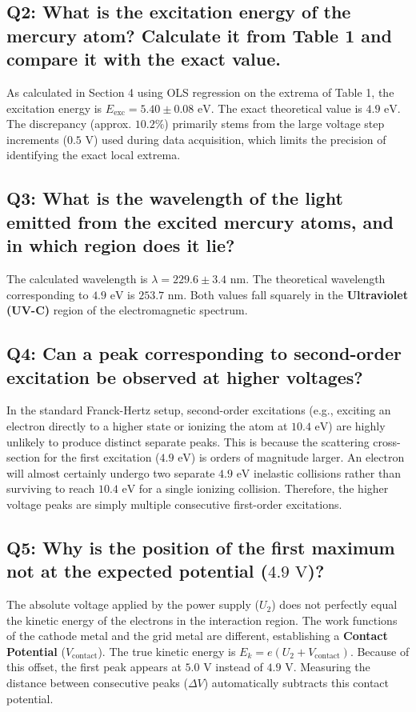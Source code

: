 \documentclass[a4paper,11pt]{article}
\begin{document}
\subsection*{Q2: What is the excitation energy of the mercury atom? Calculate it from Table 1 and compare it with the exact value.}
As calculated in Section 4 using OLS regression on the extrema of Table 1, the excitation energy is $E_{\text{exc}} = 5.40 \pm 0.08\text{ eV}$. The exact theoretical value is $4.9\text{ eV}$. The discrepancy (approx. $10.2\%$) primarily stems from the large voltage step increments ($0.5\text{ V}$) used during data acquisition, which limits the precision of identifying the exact local extrema.

\subsection*{Q3: What is the wavelength of the light emitted from the excited mercury atoms, and in which region does it lie?}
The calculated wavelength is $\lambda = 229.6 \pm 3.4\text{ nm}$. The theoretical wavelength corresponding to $4.9\text{ eV}$ is $253.7\text{ nm}$. Both values fall squarely in the \textbf{Ultraviolet (UV-C)} region of the electromagnetic spectrum.

\subsection*{Q4: Can a peak corresponding to second-order excitation be observed at higher voltages?}
In the standard Franck-Hertz setup, second-order excitations (e.g., exciting an electron directly to a higher state or ionizing the atom at $10.4\text{ eV}$) are highly unlikely to produce distinct separate peaks. This is because the scattering cross-section for the first excitation ($4.9\text{ eV}$) is orders of magnitude larger. An electron will almost certainly undergo two separate $4.9\text{ eV}$ inelastic collisions rather than surviving to reach $10.4\text{ eV}$ for a single ionizing collision. Therefore, the higher voltage peaks are simply multiple consecutive first-order excitations.

\subsection*{Q5: Why is the position of the first maximum not at the expected potential ($4.9\text{ V}$)?}
The absolute voltage applied by the power supply ($U_2$) does not perfectly equal the kinetic energy of the electrons in the interaction region. The work functions of the cathode metal and the grid metal are different, establishing a \textbf{Contact Potential} ($V_{\text{contact}}$). The true kinetic energy is $E_k = e(U_2 + V_{\text{contact}})$. Because of this offset, the first peak appears at $5.0\text{ V}$ instead of $4.9\text{ V}$. Measuring the distance between consecutive peaks ($\Delta V$) automatically subtracts this contact potential.
\end{document}
